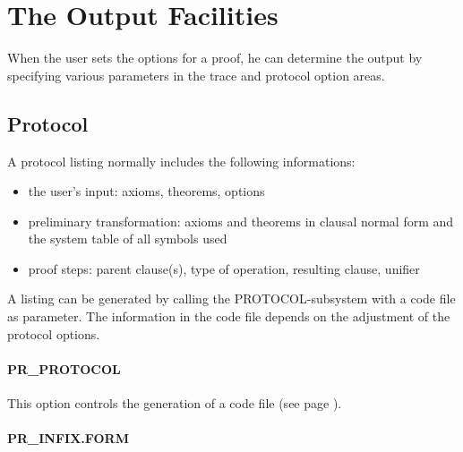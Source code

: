 \chapter{The Output Facilities}
\label{TheOutputFacilities}

When the user sets the options for a proof, he can determine the output by 
specifying various parameters in the trace and protocol option areas. 

\section{Protocol}

A protocol listing
normally includes the following informations: 
\begin{itemize} 
\item	the user's input: axioms, theorems, options 
\item	preliminary transformation: axioms and theorems in clausal
normal form and the system table of all symbols used 

\item proof steps: parent clause(s), type of operation, resulting clause, 
unifier 
\end{itemize} 

A listing can be generated by calling the PROTOCOL-subsystem with a
code file as parameter.  The information in the code file depends on
the adjustment of the protocol options.


\subsubsection{PR\_PROTOCOL}
  

This option controls the generation of a code file (see page 
\pageref{codefile}).

\PO
{}

\subsubsection{PR\_INFIX.FORM}
  
	
